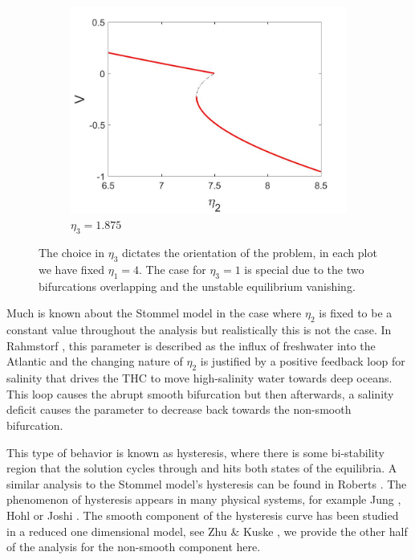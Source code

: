 \begin{figure}[H]
\begin{subfigure}{.5\textwidth}
  \includegraphics[width=\linewidth]{intro/V_bif_reverse.jpg}
  \caption{$\eta_3=1.875$}
\end{subfigure}
\caption{The choice in $\eta_3$ dictates the orientation of the problem, in each plot we have fixed $\eta_1=4$. The case for $\eta_3=1$ is special due to the two bifurcations overlapping and the unstable equilibrium vanishing.}
\label{fig:Stommel_bif_plots}
\end{figure}

Much is known about the Stommel model in the case where $\eta_2$ is fixed to be a constant value throughout the analysis but realistically this is not the case. In Rahmstorf \cite{rahmstorf2000thermohaline}, this parameter is described as the influx of freshwater into the Atlantic and the changing nature of $\eta_2$ is justified by a positive feedback loop for salinity that drives the THC to move high-salinity water towards deep oceans. This loop causes the abrupt smooth bifurcation but then afterwards, a salinity deficit causes the parameter to decrease back towards the non-smooth bifurcation.

This type of behavior is known as hysteresis, where there is some bi-stability region that the solution cycles through and hits both states of the equilibria. A similar analysis to the Stommel model's hysteresis can be found in Roberts \cite{roberts2017relaxation}. The phenomenon of hysteresis appears in many physical systems, for example Jung \cite{jung1990scaling}, Hohl \cite{hohl1995scaling} or Joshi \cite{joshi2005dynamical}. The smooth component of the hysteresis curve has been studied in a reduced one dimensional model, see Zhu \& Kuske \cite{zhu2015tipping}, we provide the other half of the analysis for the non-smooth component here.


